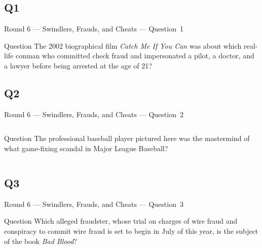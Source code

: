 \documentclass[11pt]{beamer}
\begin{document}
\subsection*{Q1}
\begin{frame}[t]{Round 6 --- Swindlers, Frauds, and Cheats --- \mbox{Question 1}}
\vspace{-0.5em}
\begin{block}{Question}
The 2002 biographical film \emph{Catch Me If You Can} was about which real-life conman who committed check fraud and impersonated a pilot, a doctor, and a lawyer before being arrested at the age of 21?
\end{block}
\end{frame}
\subsection*{Q2}
\begin{frame}[t]{Round 6 --- Swindlers, Frauds, and Cheats --- \mbox{Question 2}}
\vspace{-0.5em}
\begin{columns}[T,totalwidth=\linewidth]
\begin{column}{0.32\linewidth}
\begin{block}{Question}
The professional baseball player pictured here was the mastermind of what game-fixing scandal in Major League Baseball?
\end{block}
\end{column}
\begin{column}{0.65\linewidth}
\begin{center}
\texttt{[image: \{Images/whitesox]}.jpg}
\end{center}
\end{column}
\end{columns}
\end{frame}
\subsection*{Q3}
\begin{frame}[t]{Round 6 --- Swindlers, Frauds, and Cheats --- \mbox{Question 3}}
\vspace{-0.5em}
\begin{block}{Question}
Which alleged fraudster, whose trial on charges of wire fraud and conspiracy to commit wire fraud is set to begin in July of this year, is the subject of the book \emph{Bad Blood}?
\end{block}
\end{frame}
\end{document}
